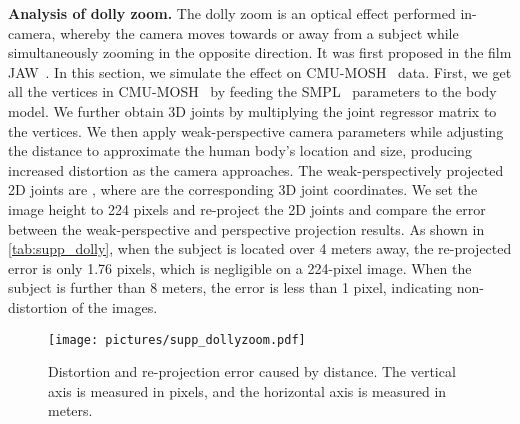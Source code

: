 \documentclass[10pt,twocolumn,letterpaper]{article}
\begin{document}
{\noindent\textbf{Analysis of dolly zoom.}
The dolly zoom is an optical effect performed in-camera, whereby the camera moves towards or away from a subject while simultaneously zooming in the opposite direction.
It was first proposed in the film JAW~\cite{jaws1975}. In this section, we simulate the effect on CMU-MOSH~\cite{mosh} data.
First, we get all the vertices in CMU-MOSH~\cite{mosh} by feeding the SMPL~\cite{smpl} parameters to the body model. 
We further obtain 3D joints by multiplying the joint regressor matrix to the vertices. 
We then apply weak-perspective camera parameters  while adjusting the distance to approximate the human body's location and size, producing increased distortion as the camera approaches.
The weak-perspectively projected 2D joints are , where  are the corresponding 3D joint coordinates. We set the image height to 224 pixels and re-project the 2D joints and compare the error between the weak-perspective and perspective projection results.
As shown in \cref{tab:supp_dolly}, when the subject is located over 4 meters away, the re-projected error is only 1.76 pixels, which is negligible on a 224-pixel image. When the subject is further than 8 meters, the error is less than 1 pixel, indicating non-distortion of the images. 




 \begin{table}
    \centering
    \caption{Distortion and re-projection error caused by distance in CMU-MOSH~\cite{mosh}. The re-projected error is measured in pixels.}
    \label{tab:supp_dolly}
    \vspace{-10pt}
\end{table}

\begin{figure}[t]
    \centering
    \texttt{[image: pictures/supp\_dollyzoom.pdf]}
    \caption{Distortion and re-projection error caused by distance. The vertical axis is measured in pixels, and the horizontal axis is measured in meters.}
    \label{fig:supp_dolly}
    \vspace{-5pt}
\end{figure}  

}
\end{document}
